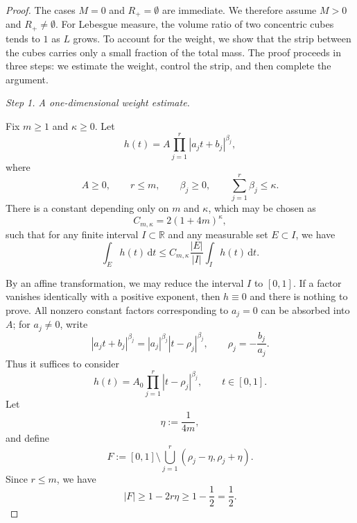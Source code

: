 \documentclass[12pt]{article}
\begin{document}
\begin{proof}
The cases $M=0$ and $R_+=\emptyset$ are immediate. We therefore assume $M>0$ and $R_+\ne\emptyset$.
For Lebesgue measure, the volume ratio of two concentric cubes tends to $1$ as $L$ grows. To account for the weight, we show that the strip between the cubes carries only a small fraction of the total mass. The proof proceeds in three steps: we estimate the weight, control the strip, and then complete the argument.


\emph{Step 1. A one-dimensional weight estimate.}

 Fix $m\ge1$ and $\kappa\ge 0$. Let
\[
h(t)=A\prod_{j=1}^{r}|a_j t+b_j|^{\beta_j},
\]
where
\[
A\ge 0,\qquad r\le m,\qquad \beta_j\ge 0,\qquad \sum_{j=1}^{r}\beta_j\le \kappa.
\]
There is a constant depending only on $m$ and $\kappa$, which may be chosen as
\[
C_{m,\kappa}=2(1+4m)^{\kappa},
\]
such that for any finite interval $I\subset\mathbb{R}$ and any measurable set $E\subset I$, we have
\[
\int_{E} h(t)\,\mathrm{d}t \le C_{m,\kappa}\frac{|E|}{|I|}\int_{I} h(t)\,\mathrm{d}t.
\]

By an affine transformation, we may reduce the interval $I$ to $[0,1]$.
If a factor vanishes identically with a positive exponent, then $h\equiv0$ and there is nothing to prove. All nonzero constant factors corresponding to $a_j=0$ can be absorbed into $A$;
for $a_j\neq 0$, write
\[
|a_j t + b_j|^{\beta_j}=|a_j|^{\beta_j}|t-\rho_j|^{\beta_j},\qquad \rho_j=-\frac{b_j}{a_j}.
\]
Thus it suffices to consider
\[
h(t)=A_0\prod_{j=1}^{r}|t-\rho_j|^{\beta_j},\qquad t\in[0,1].
\]
Let
\[
\eta:=\frac{1}{4m},
\]
and define
\[
F:=[0,1]\setminus \bigcup_{j=1}^{r}(\rho_j-\eta,\rho_j+\eta).
\]
Since $r\le m$, we have
\begin{equation}
|F|\ge 1-2r\eta\ge 1-\frac12=\frac12.
\end{equation}


\end{proof}
\end{document}
